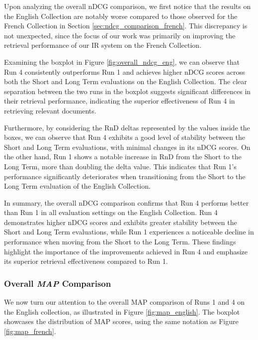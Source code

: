 Upon analyzing the overall \ac{nDCG} comparison, we first notice that the results on the English Collection are notably worse compared to those observed for the French Collection in Section \ref{sec:ndcg_comparison_french}. 
This discrepancy is not unexpected, since the focus of our work was primarily on improving the retrieval performance of our \ac{IR} system on the French Collection.

Examining the boxplot in Figure \ref{fig:overall_ndcg_eng}, we can observe that Run 4 consistently outperforms Run 1 and achieves higher \ac{nDCG} scores across both the Short and Long Term evaluations on the English Collection.  
The clear separation between the two runs in the boxplot suggests significant differences in their retrieval performance, indicating the superior effectiveness of Run 4 in retrieving relevant documents.

Furthermore, by considering the \ac{RnD} deltas represented by the values inside the boxes, we can observe that Run 4 exhibits a good level of stability between the Short and Long Term evaluations, with minimal changes in its \ac{nDCG} scores. 
On the other hand, Run 1 shows a notable increase in \ac{RnD} from the Short to the Long Term, more than doubling the delta value. 
This indicates that Run 1's performance significantly deteriorates when transitioning from the Short to the Long Term evaluation of the English Collection.

In summary, the overall \ac{nDCG} comparison confirms that Run 4 performs better than Run 1 in all evaluation settings on the English Collection. 
Run 4 demonstrates higher \ac{nDCG} scores and exhibits greater stability between the Short and Long Term evaluations, while Run 1 experiences a noticeable decline in performance when moving from the Short to the Long Term. 
These findings highlight the importance of the improvements achieved in Run 4 and emphasize its superior retrieval effectiveness compared to Run 1.

\enlargethispage{6\baselineskip}
\subsubsection{Overall \textit{MAP} Comparison} \label{sec:map_comparison_eng}

We now turn our attention to the overall \ac{MAP} comparison of Runs 1 and 4 on the English collection, as illustrated in Figure \ref{fig:map_english}. 
The boxplot showcases the distribution of \ac{MAP} scores, using the same notation as Figure \ref{fig:map_french}.

